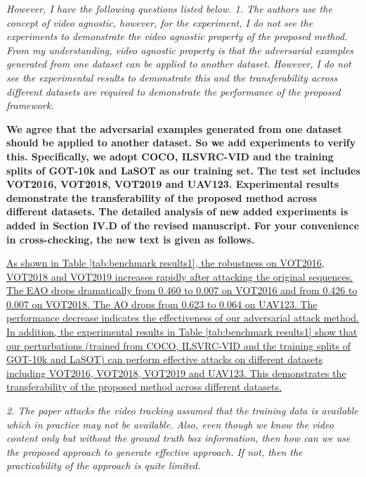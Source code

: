 \documentclass[12pt]{article}
\begin{document}
\textit{However, I have the following questions listed below. 1. The authors use the concept of video agnostic, however, for the experiment, I do not see the experiments to demonstrate the video agnostic property of the proposed method. From my understanding, video agnostic property is that the adversarial examples generated from one dataset can be applied to another dataset. However, I do not see the experimental results to demonstrate this and the transferability across different datasets are required to demonstrate the performance of the proposed framework.}

\textbf{
We agree that the adversarial examples generated from one dataset should be applied to another dataset. So we add experiments to verify this. Specifically, we adopt COCO, ILSVRC-VID and the training splits of GOT-10k and LaSOT as our training set. The test set includes VOT2016, VOT2018, VOT2019 and UAV123.
Experimental results demonstrate the transferability of the proposed method across different datasets.
The detailed analysis of new added experiments is added in Section IV.D of the revised manuscript. For your convenience in cross-checking, the new text is given as follows.}

\uline{As shown in Table \ref{tab:benchmark results1}, the robustness on VOT2016, VOT2018 and VOT2019 increases rapidly after attacking the original sequences. The EAO drops dramatically from 0.460 to 0.007 on VOT2016 and from 0.426 to 0.007 on VOT2018. The AO drops from 0.623 to 0.064 on UAV123. The performance decrease indicates the effectiveness of our adversarial attack method.
In addition, the experimental results in Table \ref{tab:benchmark results1} show that our perturbations (trained from COCO, ILSVRC-VID and the training splits of GOT-10k and LaSOT) can perform effective attacks on different datasets including VOT2016, VOT2018, VOT2019 and UAV123. This demonstrates the transferability of the proposed method across different datasets.
}

\textit{2. The paper attacks the video tracking assumed that the training data is available which in practice may not be available. Also, even though we know the video content only but without the ground truth box information, then how can we use the proposed approach to generate effective approach. If not, then the practicability of the approach is quite limited.}

\end{document}
